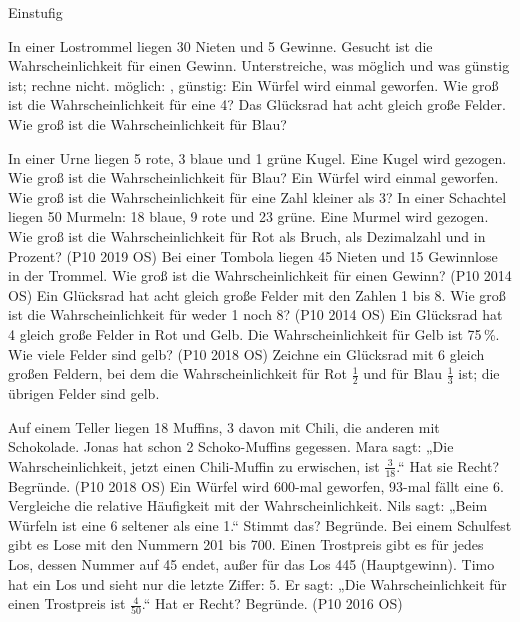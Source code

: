 \begin{aufgabe}{Einstufig}
\begin{teile}
\teil In einer Lostrommel liegen 30 Nieten und 5 Gewinne. Gesucht ist die Wahrscheinlichkeit für einen Gewinn. Unterstreiche, was möglich und was günstig ist; rechne nicht. möglich: \leerfeld , günstig: \leerfeld
\teil Ein Würfel wird einmal geworfen. Wie groß ist die Wahrscheinlichkeit für eine 4?
\teil Das Glücksrad hat acht gleich große Felder. Wie groß ist die Wahrscheinlichkeit für Blau?

\teil In einer Urne liegen 5 rote, 3 blaue und 1 grüne Kugel. Eine Kugel wird gezogen. Wie groß ist die Wahrscheinlichkeit für Blau?
\teil Ein Würfel wird einmal geworfen. Wie groß ist die Wahrscheinlichkeit für eine Zahl kleiner als 3?
\teil In einer Schachtel liegen 50 Murmeln: 18 blaue, 9 rote und 23 grüne. Eine Murmel wird gezogen. Wie groß ist die Wahrscheinlichkeit für Rot als Bruch, als Dezimalzahl und in Prozent? \hfill (P10 2019 OS)
\teil Bei einer Tombola liegen 45 Nieten und 15 Gewinnlose in der Trommel. Wie groß ist die Wahrscheinlichkeit für einen Gewinn? \hfill (P10 2014 OS)
\teil Ein Glücksrad hat acht gleich große Felder mit den Zahlen 1 bis 8. Wie groß ist die Wahrscheinlichkeit für weder 1 noch 8? \hfill (P10 2014 OS)
\teil Ein Glücksrad hat 4 gleich große Felder in Rot und Gelb. Die Wahrscheinlichkeit für Gelb ist 75\,\%. Wie viele Felder sind gelb? \hfill (P10 2018 OS)
\teil Zeichne ein Glücksrad mit 6 gleich großen Feldern, bei dem die Wahrscheinlichkeit für Rot $\frac{1}{2}$ und für Blau $\frac{1}{3}$ ist; die übrigen Felder sind gelb.

\kreisleer[2]
\teil Auf einem Teller liegen 18 Muffins, 3 davon mit Chili, die anderen mit Schokolade. Jonas hat schon 2 Schoko-Muffins gegessen. Mara sagt: „Die Wahrscheinlichkeit, jetzt einen Chili-Muffin zu erwischen, ist $\frac{3}{18}$.“ Hat sie Recht? Begründe. \hfill (P10 2018 OS)
\teil Ein Würfel wird 600-mal geworfen, 93-mal fällt eine 6. Vergleiche die relative Häufigkeit mit der Wahrscheinlichkeit.
\teil Nils sagt: „Beim Würfeln ist eine 6 seltener als eine 1.“ Stimmt das? Begründe.
\teil Bei einem Schulfest gibt es Lose mit den Nummern 201 bis 700. Einen Trostpreis gibt es für jedes Los, dessen Nummer auf 45 endet, außer für das Los 445 (Hauptgewinn). Timo hat ein Los und sieht nur die letzte Ziffer: 5. Er sagt: „Die Wahrscheinlichkeit für einen Trostpreis ist $\frac{4}{50}$.“ Hat er Recht? Begründe. \hfill (P10 2016 OS)
\end{teile}
\end{aufgabe}


